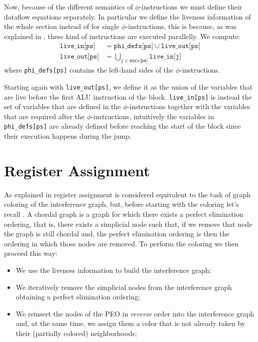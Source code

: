 Now, because of the different semantics of $\phi$-instructions we must define their dataflow equations separately. In particular we define the liveness information of the whole section instead of for single $\phi$-instructions, this is because, as was explained in , these kind of instructions are executed parallelly.
We compute:
\begin{align*}
  \texttt{live\_in[ps]} &= \texttt{phi\_defs[ps]} \cup \texttt{live\_out[ps]} \\
  \texttt{live\_out[ps]} &= \bigcup \limits_{\texttt j \in \texttt{succ[ps]}} \texttt{live\_in[j]}
\end{align*}
where \texttt{phi\_defs[ps]} contains the left-hand sides of the $\phi$-instructions.

Starting again with \texttt{live\_out[ps]}, we define it as the union of the variables that are live before the first ALU instruction of the block. \texttt{live\_in[ps]} is instead the set of variables that are defined in the $\phi$-instructions together with the variables that are required after the $\phi$-instructions, intuitively the variables in \texttt{phi\_defs[ps]} are already defined before reaching the start of the block since their execution happens during the jump.

\section{Register Assignment}
\label{sec:ra}

As explained in  register assignment is considered equivalent to the task of graph coloring of the interference graph, but, before starting with the coloring let's recall . A chordal graph is a graph for which there exists a perfect elimination ordering, that is, there exists a simplicial node such that, if we remove that node the graph is still chordal and, the perfect elimination ordering is then the ordering in which those nodes are removed.
To perform the coloring we then proceed this way:
\begin{itemize}
  \item We use the liveness information to build the interference graph;
  \item We iteratively remove the simplicial nodes from the interference graph obtaining a perfect elimination ordering;
  \item We reinsert the nodes of the PEO in \textit{reverse} order into the interference graph and, at the same time, we assign them a color that is not already taken by their (partially colored) neighborhoods;
\end{itemize}


